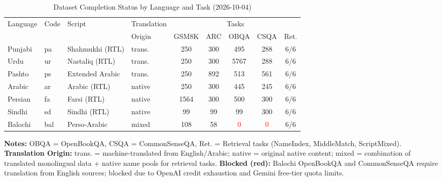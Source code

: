 \begin{table}[htbp]
\centering
\caption{Dataset Completion Status by Language and Task (2026-10-04)}
\label{tab:dataset_status}
\footnotesize
\begin{tabular}{llllccccc}
\toprule
Language & Code & Script & Translation & \multicolumn{5}{c}{Tasks} \\
\cmidrule(l){4-9}
 &  &  & Origin & GSM8K & ARC & OBQA & CSQA & Ret.\\
\midrule
Punjabi  & pa   & Shahmukhi (RTL) & trans.    & 250 & 300 & 495 & 288 & 6/6 \\
Urdu     & ur   & Nastaliq (RTL)  & trans.    & 250 & 300 & 5767 & 288 & 6/6 \\
Pashto   & ps   & Extended Arabic & trans.    & 250 & 892 & 513 & 561 & 6/6 \\
Arabic   & ar   & Arabic (RTL)    & native    & 250 & 300 & 445 & 245 & 6/6 \\
Persian  & fa   & Farsi (RTL)     & native    & 1564 & 300 & 500 & 300 & 6/6 \\
Sindhi   & sd   & Sindhi (RTL)    & native    & 99 & 99 & 99 & 300 & 6/6 \\
Balochi  & bal  & Perso-Arabic    & mixed     & 108 & 58 & \textcolor{red}{0} & \textcolor{red}{0} & 6/6 \\
\bottomrule
\end{tabular}
\end{table}

\vspace{1em}
\textbf{Notes:} OBQA = OpenBookQA, CSQA = CommonSenseQA, Ret. = Retrieval tasks (NameIndex, MiddleMatch, ScriptMixed). 
\textbf{Translation Origin:} trans. = machine-translated from English/Arabic; native = original native content; mixed = combination of translated monolingual data + native name pools for retrieval tasks.
\textbf{Blocked (red):} Balochi OpenBookQA and CommonSenseQA require translation from English sources; blocked due to OpenAI credit exhaustion and Gemini free-tier quota limits.
